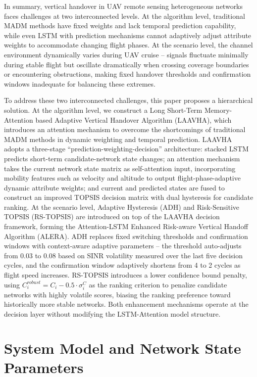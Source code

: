 \documentclass[journal,article,submit,moreauthors]{Definitions/mdpi}
\begin{document}
In summary, vertical handover in UAV remote sensing heterogeneous networks faces challenges at two interconnected levels. At the algorithm level, traditional MADM methods have fixed weights and lack temporal prediction capability, while even LSTM with prediction mechanisms cannot adaptively adjust attribute weights to accommodate changing flight phases. At the scenario level, the channel environment dynamically varies during UAV cruise -- signals fluctuate minimally during stable flight but oscillate dramatically when crossing coverage boundaries or encountering obstructions, making fixed handover thresholds and confirmation windows inadequate for balancing these extremes.

To address these two interconnected challenges, this paper proposes a hierarchical solution. At the algorithm level, we construct a Long Short-Term Memory-Attention based Adaptive Vertical Handover Algorithm (LAAVHA), which introduces an attention mechanism to overcome the shortcomings of traditional MADM methods in dynamic weighting and temporal prediction. LAAVHA adopts a three-stage ``prediction-weighting-decision'' architecture: stacked LSTM predicts short-term candidate-network state changes; an attention mechanism takes the current network state matrix as self-attention input, incorporating mobility features such as velocity and altitude to output flight-phase-adaptive dynamic attribute weights; and current and predicted states are fused to construct an improved TOPSIS decision matrix with dual hysteresis for candidate ranking. At the scenario level, Adaptive Hysteresis (ADH) and Risk-Sensitive TOPSIS (RS-TOPSIS) are introduced on top of the LAAVHA decision framework, forming the Attention-LSTM Enhanced Risk-aware Vertical Handoff Algorithm (ALERA). ADH replaces fixed switching thresholds and confirmation windows with context-aware adaptive parameters -- the threshold auto-adjusts from 0.03 to 0.08 based on SINR volatility measured over the last five decision cycles, and the confirmation window adaptively shortens from 4 to 2 cycles as flight speed increases. RS-TOPSIS introduces a lower confidence bound penalty, using $C_i^{robust} = C_i - 0.5 \cdot \sigma_i^C$ as the ranking criterion to penalize candidate networks with highly volatile scores, biasing the ranking preference toward historically more stable networks. Both enhancement mechanisms operate at the decision layer without modifying the LSTM-Attention model structure.

\section{System Model and Network State Parameters}
\label{sec:system}
\end{document}
